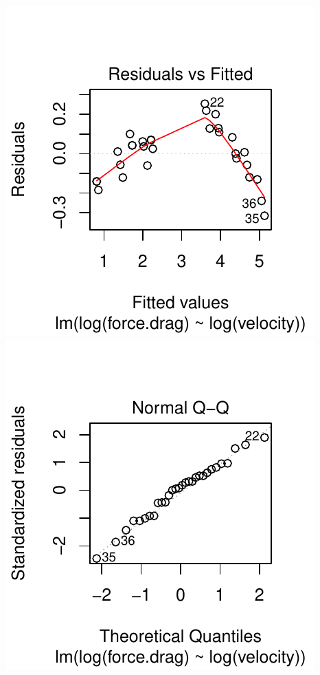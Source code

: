 \documentclass[twoside]{book}\usepackage[]{graphicx}\usepackage[]{xcolor}
\makeatletter
\def\maxwidth{ %
  \ifdim\Gin@nat@width>\linewidth
    \linewidth
  \else
    \Gin@nat@width
  \fi
}
\newenvironment{knitrout}{}{} %
\makeatother
\begin{document}
\begin{solution}
\begin{knitrout}
{\centering \includegraphics[width=\maxwidth]{figures/fig-unnamed-chunk-285-1} 
\includegraphics[width=\maxwidth]{figures/fig-unnamed-chunk-285-2} 

}




\end{knitrout}
\end{solution}
\end{document}
